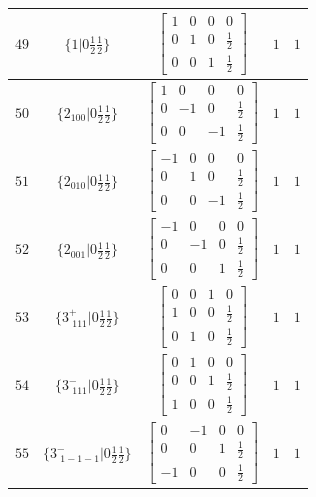 \documentclass[fleqn,8pt]{jsarticle}
\begin{document}
\begin{longtable}{ccccc}
$ 49 $ & $ \{1|0 \frac{1}{2} \frac{1}{2}\} $ & $ \begin{bmatrix} 1 & 0 & 0 & 0 \\ 0 & 1 & 0 & \frac{1}{2} \\ 0 & 0 & 1 & \frac{1}{2} \end{bmatrix} $ & $ 1 $ & $ 1 $ \\ \hline
$ 50 $ & $ \{2{}_{100}|0 \frac{1}{2} \frac{1}{2}\} $ & $ \begin{bmatrix} 1 & 0 & 0 & 0 \\ 0 & -1 & 0 & \frac{1}{2} \\ 0 & 0 & -1 & \frac{1}{2} \end{bmatrix} $ & $ 1 $ & $ 1 $ \\ \hline
$ 51 $ & $ \{2{}_{010}|0 \frac{1}{2} \frac{1}{2}\} $ & $ \begin{bmatrix} -1 & 0 & 0 & 0 \\ 0 & 1 & 0 & \frac{1}{2} \\ 0 & 0 & -1 & \frac{1}{2} \end{bmatrix} $ & $ 1 $ & $ 1 $ \\ \hline
$ 52 $ & $ \{2{}_{001}|0 \frac{1}{2} \frac{1}{2}\} $ & $ \begin{bmatrix} -1 & 0 & 0 & 0 \\ 0 & -1 & 0 & \frac{1}{2} \\ 0 & 0 & 1 & \frac{1}{2} \end{bmatrix} $ & $ 1 $ & $ 1 $ \\ \hline
$ 53 $ & $ \{3^{+}_{\,\,111}|0 \frac{1}{2} \frac{1}{2}\} $ & $ \begin{bmatrix} 0 & 0 & 1 & 0 \\ 1 & 0 & 0 & \frac{1}{2} \\ 0 & 1 & 0 & \frac{1}{2} \end{bmatrix} $ & $ 1 $ & $ 1 $ \\ \hline
$ 54 $ & $ \{3^{-}_{\,\,111}|0 \frac{1}{2} \frac{1}{2}\} $ & $ \begin{bmatrix} 0 & 1 & 0 & 0 \\ 0 & 0 & 1 & \frac{1}{2} \\ 1 & 0 & 0 & \frac{1}{2} \end{bmatrix} $ & $ 1 $ & $ 1 $ \\ \hline
$ 55 $ & $ \{3^{-}_{\,\,1-1-1}|0 \frac{1}{2} \frac{1}{2}\} $ & $ \begin{bmatrix} 0 & -1 & 0 & 0 \\ 0 & 0 & 1 & \frac{1}{2} \\ -1 & 0 & 0 & \frac{1}{2} \end{bmatrix} $ & $ 1 $ & $ 1 $ \\ \hline

\end{longtable}
\end{document}
